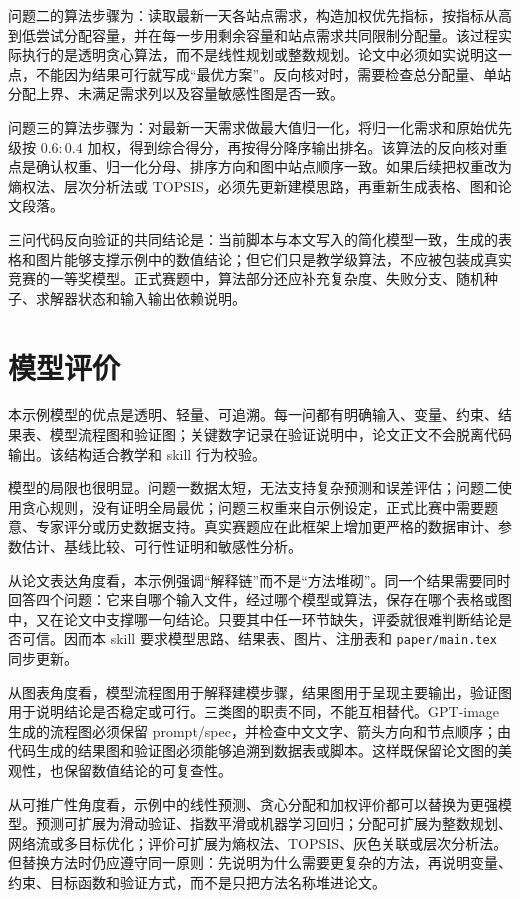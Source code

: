\documentclass[12pt]{ctexart}
\begin{document}
问题二的算法步骤为：读取最新一天各站点需求，构造加权优先指标，按指标从高到低尝试分配容量，并在每一步用剩余容量和站点需求共同限制分配量。该过程实际执行的是透明贪心算法，而不是线性规划或整数规划。论文中必须如实说明这一点，不能因为结果可行就写成“最优方案”。反向核对时，需要检查总分配量、单站分配上界、未满足需求列以及容量敏感性图是否一致。

问题三的算法步骤为：对最新一天需求做最大值归一化，将归一化需求和原始优先级按 \(0.6:0.4\) 加权，得到综合得分，再按得分降序输出排名。该算法的反向核对重点是确认权重、归一化分母、排序方向和图中站点顺序一致。如果后续把权重改为熵权法、层次分析法或 TOPSIS，必须先更新建模思路，再重新生成表格、图和论文段落。

三问代码反向验证的共同结论是：当前脚本与本文写入的简化模型一致，生成的表格和图片能够支撑示例中的数值结论；但它们只是教学级算法，不应被包装成真实竞赛的一等奖模型。正式赛题中，算法部分还应补充复杂度、失败分支、随机种子、求解器状态和输入输出依赖说明。

\section{模型评价}

本示例模型的优点是透明、轻量、可追溯。每一问都有明确输入、变量、约束、结果表、模型流程图和验证图；关键数字记录在验证说明中，论文正文不会脱离代码输出。该结构适合教学和 skill 行为校验。

模型的局限也很明显。问题一数据太短，无法支持复杂预测和误差评估；问题二使用贪心规则，没有证明全局最优；问题三权重来自示例设定，正式比赛中需要题意、专家评分或历史数据支持。真实赛题应在此框架上增加更严格的数据审计、参数估计、基线比较、可行性证明和敏感性分析。

从论文表达角度看，本示例强调“解释链”而不是“方法堆砌”。同一个结果需要同时回答四个问题：它来自哪个输入文件，经过哪个模型或算法，保存在哪个表格或图中，又在论文中支撑哪一句结论。只要其中任一环节缺失，评委就很难判断结论是否可信。因而本 skill 要求模型思路、结果表、图片、注册表和 \texttt{paper/main.tex} 同步更新。

从图表角度看，模型流程图用于解释建模步骤，结果图用于呈现主要输出，验证图用于说明结论是否稳定或可行。三类图的职责不同，不能互相替代。GPT-image 生成的流程图必须保留 prompt/spec，并检查中文文字、箭头方向和节点顺序；由代码生成的结果图和验证图必须能够追溯到数据表或脚本。这样既保留论文图的美观性，也保留数值结论的可复查性。

从可推广性角度看，示例中的线性预测、贪心分配和加权评价都可以替换为更强模型。预测可扩展为滑动验证、指数平滑或机器学习回归；分配可扩展为整数规划、网络流或多目标优化；评价可扩展为熵权法、TOPSIS、灰色关联或层次分析法。但替换方法时仍应遵守同一原则：先说明为什么需要更复杂的方法，再说明变量、约束、目标函数和验证方式，而不是只把方法名称堆进论文。
\end{document}

